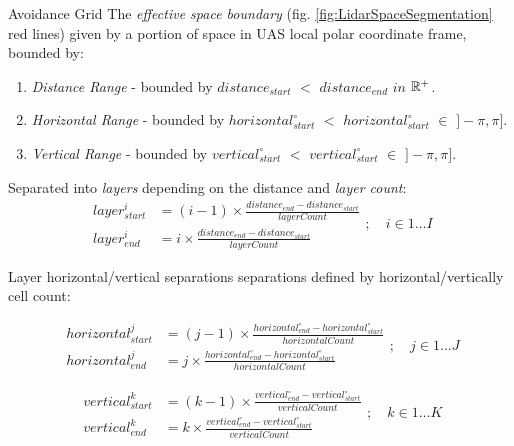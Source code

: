\begin{definition}{Avoidance Grid}\label{def:AvoidanceGrid} The \emph{effective space boundary} (fig. \ref{fig:LidarSpaceSegmentation} red lines) given by a portion of space in UAS local polar coordinate frame, bounded by:
    \begin{enumerate}
        \item \emph{Distance Range} -  bounded by $distance_{start}$ $<$ $distance_{end}$ $in$ $\mathbb{R}^+$.
        \item \emph{Horizontal Range} - bounded by $horizontal^\circ_{start}$ $<$ $horizontal^\circ_{start}$ $\in$ $]-\pi,\pi]$.
        \item \emph{Vertical Range} - bounded by $vertical^\circ_{start}$ $<$ $vertical^\circ_{start}$ $\in$ $]-\pi,\pi]$.
    \end{enumerate}

\noindent Separated into \emph{layers} depending on the distance and \emph{layer count}:
\begin{equation}\label{eq:avoidanceGridCellDistanceRange}
    \begin{aligned}
        layer^i_{start} & = (i-1)\times\frac{distance_{end}-distance_{start}}{layer Count}\\
        layer^i_{end} & = i\times\frac{distance_{end}-distance_{start}}{layer Count}
    \end{aligned};\quad i\in 1\dots I
\end{equation}

\noindent Layer horizontal/vertical separations separations defined by horizontal/vertically cell count:

\begin{equation}\label{eq:avoidanceGridCellHorizontalRange}
    \begin{aligned}
        horizontal^j_{start} & = (j-1)\times\frac{horizontal^\circ_{end}-horizontal^\circ_{start}}{horizontal Count}\\
        horizontal^j_{end} & = j\times\frac{horizontal^\circ_{end}-horizontal^\circ_{start}}{horizontal Count}
    \end{aligned};\quad j\in 1\dots J
\end{equation}

\begin{equation}\label{eq:avoidanceGridCellVerticalRange}
    \begin{aligned}
        vertical^k_{start} & = (k-1)\times\frac{vertical^\circ_{end}-vertical^\circ_{start}}{vertical Count}\\
        vertical^k_{end} & = k\times\frac{vertical^\circ_{end}-vertical^\circ_{start}}{vertical Count}
    \end{aligned};\quad k\in 1\dots K
\end{equation}


\end{definition}
